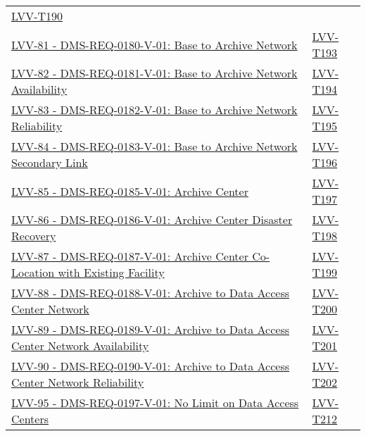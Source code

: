 \begin{longtable}[]{p{13cm}p{3cm}}
\protect\hyperlink{lvv-t190---verify-implementation-of-base-facility-co-location-with-existing-facility}{LVV-T190}\tabularnewline
\href{https://jira.lsstcorp.org/browse/LVV-81}{LVV-81 -
DMS-REQ-0180-V-01: Base to Archive Network} &
\protect\hyperlink{lvv-t193---verify-implementation-of-base-to-archive-network}{LVV-T193}\tabularnewline
\href{https://jira.lsstcorp.org/browse/LVV-82}{LVV-82 -
DMS-REQ-0181-V-01: Base to Archive Network Availability} &
\protect\hyperlink{lvv-t194---verify-implementation-of-base-to-archive-network-availability}{LVV-T194}\tabularnewline
\href{https://jira.lsstcorp.org/browse/LVV-83}{LVV-83 -
DMS-REQ-0182-V-01: Base to Archive Network Reliability} &
\protect\hyperlink{lvv-t195---verify-implementation-of-base-to-archive-network-reliability}{LVV-T195}\tabularnewline
\href{https://jira.lsstcorp.org/browse/LVV-84}{LVV-84 -
DMS-REQ-0183-V-01: Base to Archive Network Secondary Link} &
\protect\hyperlink{lvv-t196---verify-implementation-of-base-to-archive-network-secondary-link}{LVV-T196}\tabularnewline
\href{https://jira.lsstcorp.org/browse/LVV-85}{LVV-85 -
DMS-REQ-0185-V-01: Archive Center} &
\protect\hyperlink{lvv-t197---verify-implementation-of-archive-center}{LVV-T197}\tabularnewline
\href{https://jira.lsstcorp.org/browse/LVV-86}{LVV-86 -
DMS-REQ-0186-V-01: Archive Center Disaster Recovery} &
\protect\hyperlink{lvv-t198---verify-implementation-of--archive-center-disaster-recovery}{LVV-T198}\tabularnewline
\href{https://jira.lsstcorp.org/browse/LVV-87}{LVV-87 -
DMS-REQ-0187-V-01: Archive Center Co-Location with Existing Facility} &
\protect\hyperlink{lvv-t199---verify-implementation-of-archive-center-co-location-with-existing-facility}{LVV-T199}\tabularnewline
\href{https://jira.lsstcorp.org/browse/LVV-88}{LVV-88 -
DMS-REQ-0188-V-01: Archive to Data Access Center Network} &
\protect\hyperlink{lvv-t200---verify-implementation-of-archive-to-data-access-center-network}{LVV-T200}\tabularnewline
\href{https://jira.lsstcorp.org/browse/LVV-89}{LVV-89 -
DMS-REQ-0189-V-01: Archive to Data Access Center Network Availability} &
\protect\hyperlink{lvv-t201---verify-implementation-of-archive-to-data-access-center-network-availability}{LVV-T201}\tabularnewline
\href{https://jira.lsstcorp.org/browse/LVV-90}{LVV-90 -
DMS-REQ-0190-V-01: Archive to Data Access Center Network Reliability} &
\protect\hyperlink{lvv-t202---verify-implementation-of-archive-to-data-access-center-network-reliability}{LVV-T202}\tabularnewline
\href{https://jira.lsstcorp.org/browse/LVV-95}{LVV-95 -
DMS-REQ-0197-V-01: No Limit on Data Access Centers} &
\protect\hyperlink{lvv-t212---verify-implementation-of-no-limit-on-data-access-centers}{LVV-T212}\tabularnewline

\end{longtable}
